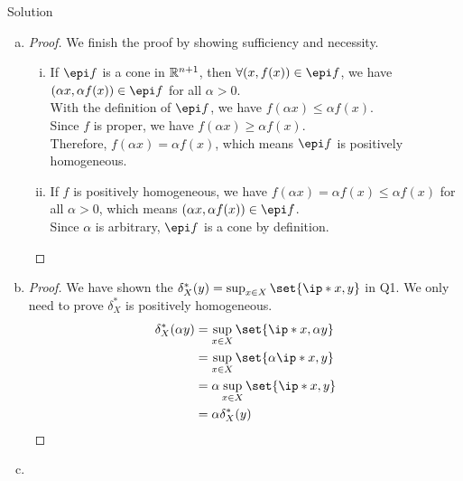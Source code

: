 \documentclass{article}
\begin{document}
\begin{solution}
    {Solution}
    \begin{enumerate}[(a)]
        \item {
            \begin{proof}
                We finish the proof by showing sufficiency and necessity.
                \begin{enumerate}[(i)]
                    \item {
                        If $\epi f$ is a cone in $\mathbb{R}^{n+1}$, then $\forall (x, f(x))\in\epi f$, we have $(\alpha x, \alpha f(x))\in\epi f$ for all $\alpha>0$. \\
                        With the definition of $\epi f$, we have $f(\alpha x)\leq \alpha f(x)$. \\
                        Since $f$ is proper, we have $f(\alpha x)\geq \alpha f(x)$. \\
                        Therefore, $f(\alpha x) = \alpha f(x)$, which means $\epi f$ is positively homogeneous.
                    }
                    \item {
                        If $f$ is positively homogeneous, we have $f(\alpha x) = \alpha f(x) \leq \alpha f(x)$ for all $\alpha>0$, which means $(\alpha x, \alpha f(x))\in\epi f$. \\
                        Since $\alpha$ is arbitrary, $\epi f$ is a cone by definition.
                    }
                \end{enumerate}
            \end{proof}
        }
        \item {
            \begin{proof}
                We have shown the $\delta_X^*(y)=\sup_{x\in X}\set{\ip*{x, y}}$ in Q1. We only need to prove $\delta_X^*$ is positively homogeneous. \\
                \begin{align*}
                    \delta_X^*(\alpha y) 
                    &= \sup_{x\in X}\set{\ip*{x, \alpha y}} \\
                    &= \sup_{x\in X}\set{\alpha\ip*{x, y}} \\
                    &= \alpha\sup_{x\in X}\set{\ip*{x, y}} \\
                    &= \alpha\delta_X^*(y)
                \end{align*}
            \end{proof}
        }
        \item {
}
\end{enumerate}
\end{solution}
\end{document}

